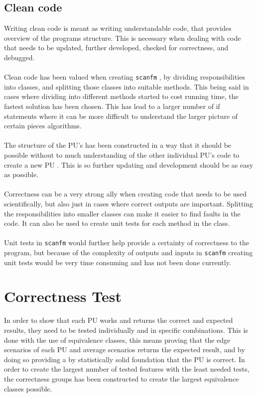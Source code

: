 \documentclass[12pt]{article}
\newcommand{\sfm}{\texttt{scanfm} }
\newcommand{\pu}{PU }
\newcommand{\pus}{PU's }
\begin{document}
\subsection{Clean code}
Writing clean code is meant as writing understandable code, that provides overview of the programs
structure. This is necessary when dealing with code that needs to be updated, further developed,
checked for correctness, and debugged. \\ \\
Clean code has been valued when creating \sfm, by dividing responsibilities into classes, and splitting 
those classes into suitable methods. This being said in cases where dividing into different methods 
started to cost running time, the fastest solution has been chosen. This has lead to a larger number of if statements where it can be more difficult to understand the larger picture of certain pieces algorithms. \\ \\
The structure of the \pus has been constructed in a way that it should be possible without to much understanding of the other individual \pus code to create a new \pu. This is so further updating and
development should be as easy as possible. \\ \\
Correctness can be a very strong ally when creating code that needs to be used scientifically, but also
just in cases where correct outputs are important. Splitting the responsibilities into smaller classes 
can make it easier to find faults in the code. It can also be used to create unit tests for each method in
the class. \\ \\
Unit tests in \sfm would further help provide a certainty of correctness to the program, but because
of the complexity of outputs and inputs in \sfm creating unit tests would be very time consuming and
has not been done currently. 


\section{Correctness Test}
In order to show that each \pu works and returns the correct and expected results, they need to be tested individually and in specific combinations. This is done with the use of equivalence classes, this means proving that the edge scenarios of each 
\pu and average scenarios returns the expected result, and by doing so providing a by statistically solid foundation that 
the \pu is correct.
In order to create the largest number of tested features with the least needed tests, the correctness groups has been constructed to create the largest equivalence classes possible. 
\end{document}
